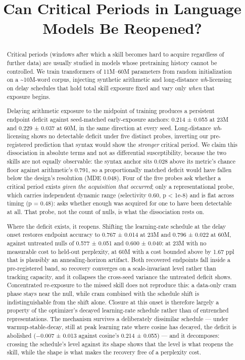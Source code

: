 \documentclass[11pt]{article}
\title{Can Critical Periods in Language Models Be Reopened?}
\author{}
\begin{document}
\maketitle
\begin{abstract}
Critical periods (windows after which a skill becomes hard to acquire regardless of
further data) are usually studied in models whose pretraining history cannot be
controlled. We train transformers of 11M--60M parameters from random initialization on a
\textasciitilde10M-word corpus, injecting synthetic arithmetic and long-distance \emph{wh}-licensing on
delay schedules that hold total skill exposure fixed and vary only \emph{when} that exposure
begins.

Delaying arithmetic exposure to the midpoint of training produces a persistent
endpoint deficit against seed-matched early-exposure anchors: 0.214 ± 0.055 at 23M and
0.229 ± 0.037 at 60M, in the same direction at every seed. Long-distance \emph{wh}-licensing
shows no detectable deficit under five distinct probes, inverting our pre-registered
prediction that syntax would show the \emph{stronger} critical period. We claim this
dissociation in absolute terms and not as differential susceptibility, because the two
skills are not equally observable: the syntax anchor sits 0.028 above its metric's
chance floor against arithmetic's 0.791, so a proportionally matched deficit would have
fallen below the design's resolution (MDE 0.048). Four of the five probes ask whether a
critical period exists \emph{given the acquisition that occurred}; only a representational
probe, which carries independent dynamic range (selectivity 0.60, p \textless{} 1e-8) and is flat
across timing (p = 0.48): asks whether enough was acquired for one to have been
detectable at all. That probe, not the count of nulls, is what the dissociation rests on.

Where the deficit exists, it reopens. Shifting the learning-rate schedule at the delay
onset restores endpoint accuracy to 0.767 ± 0.014 at 23M and 0.796 ± 0.022 at 60M,
against untreated nulls of 0.577 ± 0.051 and 0.600 ± 0.040: at 23M with no measurable
cost to held-out perplexity, at 60M with a cost bounded above by 1.67 ppl that is
plausibly an annealing-horizon artifact. Both recovered endpoints fall inside a
pre-registered band, so recovery converges on a scale-invariant level rather than
tracking capacity, and it collapses the cross-seed variance the untreated deficit shows.
Concentrated re-exposure to the missed skill does not reproduce this: a data-only cram
phase stays near the null, while cram combined with the schedule shift is
indistinguishable from the shift alone. Closure at this onset is therefore largely a
property of the optimizer's decayed learning-rate schedule rather than of entrenched
representations. The mechanism survives a deliberately dissimilar schedule --- under
warmup-stable-decay, still at peak learning rate where cosine has decayed, the deficit is
abolished (−0.007 ± 0.013 against cosine's 0.214 ± 0.055) --- and it decomposes: crossing
the schedule's level against its shape shows that the level is what reopens the skill,
while the shape is what makes the recovery free of a perplexity cost.


\end{abstract}
\end{document}
